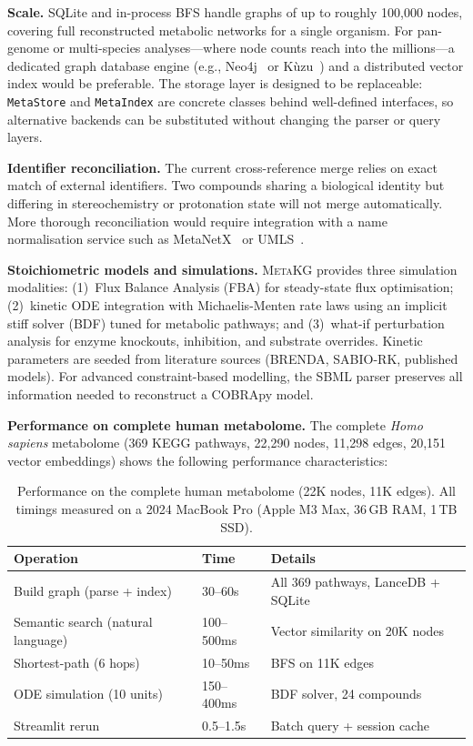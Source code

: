 \documentclass[10pt]{article}
\begin{document}
\textbf{Scale.} SQLite and in-process BFS handle graphs of up to roughly
100,000 nodes, covering full reconstructed metabolic networks for a single
organism. For pan-genome or multi-species analyses---where node counts reach
into the millions---a dedicated graph database engine (e.g.,
Neo4j~\citep{neo4j2020} or K\`uzu~\citep{feng2023kuzu}) and a distributed
vector index would be preferable. The storage layer is designed to be
replaceable: \texttt{MetaStore} and \texttt{MetaIndex} are concrete classes
behind well-defined interfaces, so alternative backends can be substituted
without changing the parser or query layers.

\textbf{Identifier reconciliation.} The current cross-reference merge relies
on exact match of external identifiers. Two compounds sharing a biological
identity but differing in stereochemistry or protonation state will not merge
automatically. More thorough reconciliation would require integration with a
name normalisation service such as
MetaNetX~\citep{moretti2021metanetx} or UMLS~\citep{bodenreider2004umls}.

\textbf{Stoichiometric models and simulations.} \textsc{MetaKG} provides
three simulation modalities: (1)~Flux Balance Analysis (FBA) for steady-state
flux optimisation; (2)~kinetic ODE integration with Michaelis-Menten rate laws
using an implicit stiff solver (BDF) tuned for metabolic pathways; and
(3)~what-if perturbation analysis for enzyme knockouts, inhibition, and
substrate overrides. Kinetic parameters are seeded from literature sources
(BRENDA, SABIO-RK, published models). For advanced constraint-based modelling,
the SBML parser preserves all information needed to reconstruct a COBRApy
model.

\textbf{Performance on complete human metabolome.} The complete
\textit{Homo sapiens} metabolome (369 KEGG pathways, 22,290 nodes, 11,298
edges, 20,151 vector embeddings) shows the following performance
characteristics:

\begin{table}[H]
  \centering
  \caption{Performance on the complete human metabolome (22K nodes, 11K edges).
  All timings measured on a 2024 MacBook Pro (Apple M3 Max, 36\,GB RAM, 1\,TB SSD).}
  \label{tab:performance}
  \small
  \begin{tabular}{@{}lll@{}}
    \toprule
    Operation & Time & Details \\
    \midrule
    Build graph (parse + index) & 30--60s & All 369 pathways, LanceDB + SQLite \\
    Semantic search (natural language) & 100--500ms & Vector similarity on 20K nodes \\
    Shortest-path (6 hops) & 10--50ms & BFS on 11K edges \\
    ODE simulation (10 units) & 150--400ms & BDF solver, 24 compounds \\
    Streamlit rerun & 0.5--1.5s & Batch query + session cache \\
    \bottomrule
  \end{tabular}
\end{table}
\end{document}
